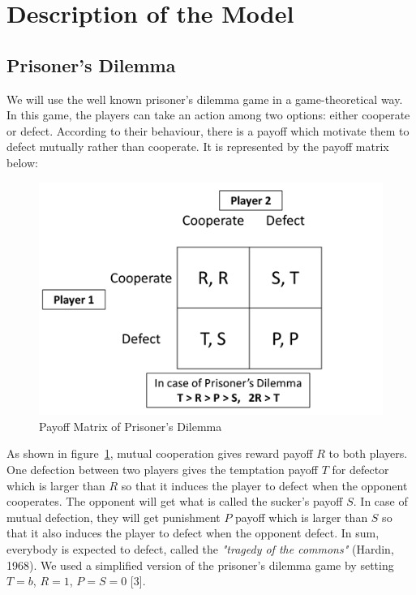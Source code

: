 \documentclass[11pt]{article}
\begin{document}
\section{Description of the Model}
\subsection{Prisoner's Dilemma}

We will use the well known prisoner's dilemma game in a game-theoretical way. In this game, the players can take an action among two options: either cooperate or defect. According to their behaviour, there is a payoff which motivate them to defect mutually rather than cooperate. It is represented by the payoff matrix below:

\begin{figure}[!htbp]
	\centering
	\includegraphics[scale=0.72]{../../other/pd_payoff_matrix.png}
    \caption{Payoff Matrix of Prisoner's Dilemma}
    \label{fig:paymatrix}
\end{figure}

\newpage
As shown in figure~\ref{fig:paymatrix}, mutual cooperation gives reward payoff $R$ to both players. One defection between two players gives the temptation payoff $T$ for defector which is larger than $R$ so that it induces the player to defect when the opponent cooperates. The opponent will get what is called the sucker's payoff $S$. In case of mutual defection, they will get punishment $P$ payoff which is larger than $S$ so that it also induces the player to defect when the opponent defect. In sum, everybody is expected to defect, called the \textit{"tragedy of the commons"} (Hardin, 1968). We used a simplified version of the prisoner's dilemma game by setting $T=b$, $R=1$, $P=S=0$ [3]. 
\end{document}

